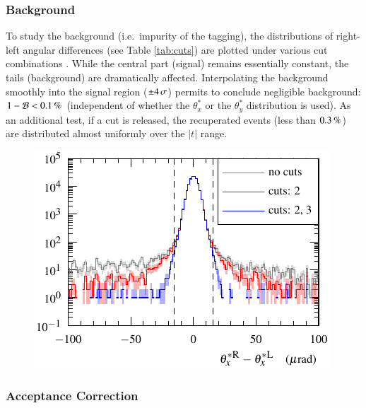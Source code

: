 
\subsubsection{Background}
\label{sec:background}

To study the background (i.e.~impurity of the tagging), the distributions of right-left angular differences (see Table \ref{tab:cuts}) are plotted under various cut combinations . While the central part (signal) remains essentially constant, the tails (background) are dramatically affected. Interpolating the background smoothly into the signal region ($\pm 4\,{\rm \sigma}$) permits to conclude negligible background: $1 - {\cal B} < 0.1\un{\%}$ (independent of whether the $\theta_x^*$ or the $\theta_y^*$ distribution is used). As an additional test, if a cut is released, the recuperated events (less than $0.3\,{\rm \%}$) are distributed almost uniformly over the $|t|$ range.


\begin{figure}
\begin{center}
\includegraphics{fig/cut_distributions.pdf}
\caption{%
}
\label{fig:tag bckg}
\end{center}
\end{figure}


\subsubsection{Acceptance Correction}
\label{sec:acc corr}

